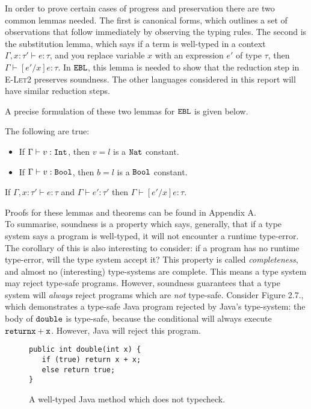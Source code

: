 In order to prove certain cases of progress and preservation there are two common lemmas needed. The first is canonical forms, which outlines a set of observations that follow immediately by observing the typing rules. The second is the substitution lemma, which says if a term is well-typed in a context $\Gamma, x: \tau' \vdash e: \tau$, and you replace variable $x$ with an expression $e'$ of type $\tau$, then $\Gamma \vdash [e'/x]e: \tau$. In $\mathtt{EBL}$, this lemma is needed to show that the reduction step in \textsc{E-Let2} preserves soundness. The other languages considered in this report will have similar reduction steps.

A precise formulation of these two lemmas for $\mathtt{EBL}$ is given below.

\begin{lemma}
The following are true:
\begin{itemize}
	\setlength\itemsep{-0.7em}
	\item If $\Gamma \vdash v: \mathtt{Int}$, then $v = l$ is a $\mathtt{Nat}$ constant.
	\item If $\Gamma \vdash v: \mathtt{Bool}$, then $b = l$ is a $\mathtt{Bool}$ constant.
\end{itemize}
\end{lemma}


\begin{lemma}[Substitution]
If $\Gamma, x: \tau' \vdash e: \tau$ and $\Gamma \vdash e': \tau'$ then $\Gamma \vdash [e'/x]e:  \tau$.
\end{lemma}

Proofs for these lemmas and theorems can be found in Appendix A.\\

To summarise, soundness is a property which says, generally, that if a type system says a program is well-typed, it will not encounter a runtime type-error. The corollary of this is also interesting to consider: if a program has no runtime type-error, will the type system accept it? This property is called \textit{completeness}, and almost no (interesting) type-systems are complete. This means a type system may reject type-safe programs. However, soundness guarantees that a type system will \textit{always} reject programs which are \textit{not} type-safe. Consider Figure 2.7., which demonstrates a type-safe Java program rejected by Java's type-system: the body of $\mathtt{double}$ is type-safe, because the conditional will always execute $\mathtt{return x+x}$. However, Java will reject this program.

\begin{figure}[h]
\vspace{-5pt}

\begin{lstlisting}
public int double(int x) {
   if (true) return x + x;
   else return true;
}
\end{lstlisting}
 
\vspace{-12pt}
\caption{A well-typed Java method which does not typecheck.}
\label{This is the label.}
\end{figure}

